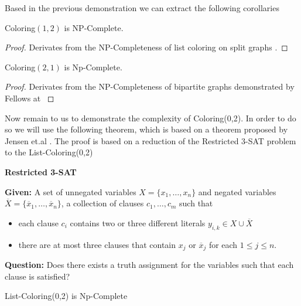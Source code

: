 \documentclass[9pt]{../document-types/entcs} \usepackage{../document-types/entcsmacro}
\newcommand{\?}{\textcolor{warn}{?}}
\begin{document}
Based in the previous demonstration we can extract the following corollaries

\begin{corollary}
  {\sc Coloring$(1,2)$} is NP-Complete.
\end{corollary}
\begin{proof}
  Derivates from the NP-Completeness of list coloring on split graphs \cite{jansen1997}.
\end{proof}

\begin{corollary}
  {\sc Coloring$(2,1)$ is Np-Complete.}
\end{corollary}
\begin{proof}
  Derivates from the NP-Completeness of bipartite graphs demonstrated by Fellows at \cite{fellows07}
\end{proof}

Now remain to us to demonstrate the complexity of {\sc Coloring(0,2)}. In order to do so we will use the following theorem, which is based on a theorem proposed by Jensen et.al \cite{jansen1999}. The proof is based on a reduction of the {\sc Restricted 3-SAT} problem to the {\sc List-Coloring(0,2)}

\textbf{Restricted 3-SAT}

\textbf{Given:} A set of unnegated variables $X = \{x_1,\ldots,x_n\}$ and negated variables  $\overline{X} = \{\overline{x}_1,\ldots,\overline{x}_n\}$, a collection of clauses $c_1,\ldots,c_m$ such that
\begin{itemize}
  \item each clause $c_i$ contains two or three different literals $y_{i,k} \in X \cup \overline{X}$
  \item there are at most three clauses that contain $x_j$ or $\overline{x}_j$ for each $1 \leq j \leq n$.
\end{itemize}

\textbf{Question:}  Does there exists a truth assignment for the variables such that each clause is satisfied?

\begin{theorem}
  {\sc List-Coloring(0,2) is Np-Complete}
\end{theorem}
\end{document}
